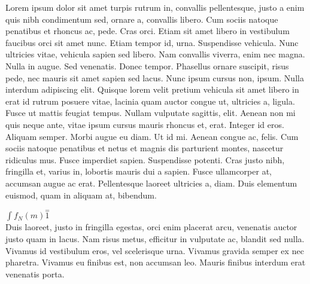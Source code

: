 \documentclass{article}
\begin{document}
Lorem ipsum dolor sit amet turpis rutrum in, convallis pellentesque, justo a enim quis nibh condimentum sed, ornare a, convallis libero. Cum sociis natoque penatibus et rhoncus ac, pede. Cras orci. Etiam sit amet libero in vestibulum faucibus orci sit amet nunc. Etiam tempor id, urna. Suspendisse vehicula. Nunc ultricies vitae, vehicula sapien sed libero. Nam convallis viverra, enim nec magna. Nulla in augue. Sed venenatis. Donec tempor. Phasellus ornare suscipit, risus pede, nec mauris sit amet sapien sed lacus. Nunc ipsum cursus non, ipsum. Nulla interdum adipiscing elit. Quisque lorem velit pretium vehicula sit amet libero in erat id rutrum posuere vitae, lacinia quam auctor congue ut, ultricies a, ligula. Fusce ut mattis feugiat tempus. Nullam vulputate sagittis, elit. Aenean non mi quis neque ante, vitae ipsum cursus mauris rhoncus et, erat. Integer id eros. Aliquam semper. Morbi augue eu diam. Ut id mi. Aenean congue ac, felis. Cum sociis natoque penatibus et netus et magnis dis parturient montes, nascetur ridiculus mus. Fusce imperdiet sapien. Suspendisse potenti. Cras justo nibh, fringilla et, varius in, lobortis mauris dui a sapien. Fusce ullamcorper at, accumsan augue ac erat. Pellentesque laoreet ultricies a, diam. Duis elementum euismod, quam in aliquam at, bibendum.

\begin{math}
	\int f_N(m) \stackrel{=} 1
\end{math}\\
Duis laoreet, justo in fringilla egestas, orci enim placerat arcu, venenatis auctor justo quam in lacus. Nam risus metus, efficitur in vulputate ac, blandit sed nulla. Vivamus id vestibulum eros, vel scelerisque urna. Vivamus gravida semper ex nec pharetra. Vivamus eu finibus est, non accumsan leo. Mauris finibus interdum erat venenatis porta. 
\end{document}
